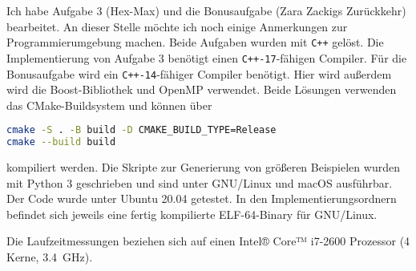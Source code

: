\documentclass[a4paper,10pt,ngerman]{scrartcl}
\author{\LARGE Teilnahme-ID: \LARGE \TeilnahmeId \\\\
	    \LARGE Bearbeiter/-in: 	    \LARGE \Name\\\\}
\begin{document}
\maketitle
Ich habe Aufgabe 3 (Hex-Max) und die Bonusaufgabe (Zara Zackigs Zurückkehr) bearbeitet. 
An dieser Stelle möchte ich noch einige Anmerkungen zur Programmierumgebung machen. 
Beide Aufgaben wurden mit \texttt{C++} gelöst.
Die Implementierung von Aufgabe 3 benötigt einen \texttt{C++-17}-fähigen Compiler. 
Für die Bonusaufgabe wird ein \texttt{C++-14}-fähiger Compiler benötigt. Hier wird außerdem wird die Boost-Bibliothek und OpenMP verwendet.
Beide Lösungen verwenden das CMake-Buildsystem und können über 
\begin{lstlisting}[language=bash]
cmake -S . -B build -D CMAKE_BUILD_TYPE=Release
cmake --build build
\end{lstlisting}
kompiliert werden. Die Skripte zur Generierung von größeren Beispielen wurden mit Python 3 geschrieben und sind unter GNU/Linux und macOS ausführbar.
Der Code wurde unter Ubuntu 20.04 getestet. 
In den Implementierungsordnern befindet sich jeweils eine fertig kompilierte ELF-64-Binary für GNU/Linux. 

Die Laufzeitmessungen beziehen sich auf einen Intel® Core™ i7-2600 Prozessor (4 Kerne, \SI{3.4}{\giga\hertz}).
\end{document}
